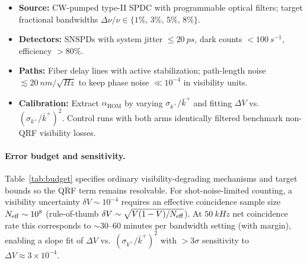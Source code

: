 \documentclass[aps,11pt]{article}
\newcommand{\kplus}{k^{+}}
\newcommand{\kbar}{\bar{k}^{+}}
\newcommand{\alphahom}{\alpha_{\text{HOM}}}
\begin{document}
\begin{itemize}[leftmargin=1.2em]
\item \textbf{Source:} CW-pumped type-II SPDC with programmable optical filters; target fractional bandwidths \(\Delta\nu/\nu\in\{1\%,\,3\%,\,5\%,\,8\%\}\).
\item \textbf{Detectors:} SNSPDs with system jitter \(\le 20~\si{ps}\), dark counts \(<100~\si{s^{-1}}\), efficiency \(>80\%\).
\item \textbf{Paths:} Fiber delay lines with active stabilization; path-length noise \(\lesssim 20~\si{nm}/\sqrt{\si{Hz}}\) to keep phase noise \(\ll 10^{-4}\) in visibility units.
\item \textbf{Calibration:} Extract \(\alphahom\) by varying \(\sigma_{\kplus}/\kbar\) and fitting \(\Delta V\) vs. \((\sigma_{\kplus}/\kbar)^2\). Control runs with both arms identically filtered benchmark non-QRF visibility losses.
\end{itemize}

\paragraph{Error budget and sensitivity.}
Table~\ref{tab:budget} specifies ordinary visibility-degrading mechanisms and target bounds so the QRF term remains resolvable. For shot-noise-limited counting, a visibility uncertainty \(\delta V \sim 10^{-4}\) requires an effective coincidence sample size \(N_{\rm eff}\sim 10^{8}\) (rule-of-thumb \(\delta V\sim \sqrt{V(1-V)/N_{\rm eff}}\)). At \(50~\si{kHz}\) net coincidence rate this corresponds to \(\sim 30\)–\(60\) minutes per bandwidth setting (with margin), enabling a slope fit of \(\Delta V\) vs.~\((\sigma_{\kplus}/\kbar)^2\) with \(>3\sigma\) sensitivity to \(\Delta V\approx 3\times 10^{-4}\).
\end{document}
